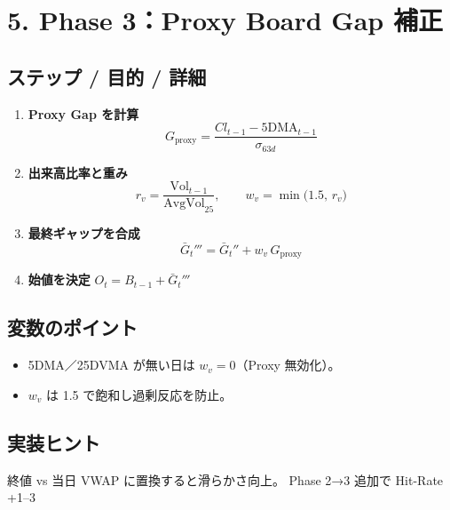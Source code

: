 \documentclass[dvipdfmx, openany]{jsbook}
\begin{document}
\section*{5. Phase 3：Proxy Board Gap 補正}\nopagebreak[4]
\subsection*{ステップ / 目的 / 詳細}
\begin{enumerate}
  \item \textbf{Proxy Gap を計算}  
        \[
          G_{\text{proxy}}=
          \frac{Cl_{t-1}-\text{5DMA}_{t-1}}{\sigma_{63d}}
        \]
  \item \textbf{出来高比率と重み}  
        \[
          r_v=\frac{\text{Vol}_{t-1}}{\text{AvgVol}_{25}},
          \qquad w_v=\min\!\bigl(1.5,\,r_v\bigr)
        \]
  \item \textbf{最終ギャップを合成}  
        \[
          \bar G_t'''=\bar G_t''+w_v\,G_{\text{proxy}}
        \]
  \item \textbf{始値を決定}  
        \(O_t=B_{t-1}+\bar G_t'''\)
\end{enumerate}

\subsection*{変数のポイント}
\begin{itemize}
  \item 5DMA／25DVMA が無い日は \(w_v=0\)（Proxy 無効化）。
  \item \(w_v\) は 1.5 で飽和し過剰反応を防止。
\end{itemize}

\subsection*{実装ヒント}
終値 vs 当日 VWAP に置換すると滑らかさ向上。  
Phase 2→3 追加で Hit-Rate +1–3 %
\end{document}
